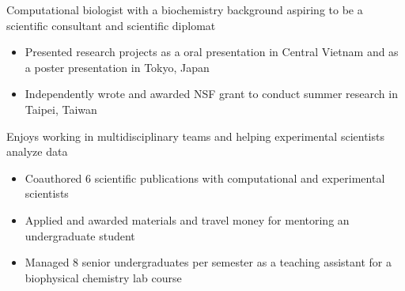 

\begin{cventries}
\vspace{-4.0mm}

  \cventry
    {} %
    {} %
    {} %
    {} %
    {
      \begin{cvitems} %
        \item {Computational biologist with a biochemistry background aspiring to be a scientific consultant and scientific diplomat}
        \begin{itemize}
       	 	\item Presented research projects as a oral presentation in Central Vietnam and as a poster presentation in Tokyo, Japan
       	 	\item Independently wrote and awarded NSF grant to conduct summer research in Taipei, Taiwan
        \end{itemize}
        \vspace{1.0mm}
        \item {Enjoys working in multidisciplinary teams and helping experimental scientists analyze data}
        \begin{itemize}
         	\item Coauthored 6 scientific publications with computational and experimental scientists
         	\item Applied and awarded materials and travel money for mentoring an undergraduate student
         	\item Managed 8 senior undergraduates per semester as a teaching assistant for a biophysical chemistry lab course
        \end{itemize}
      \end{cvitems}
    }
\vspace{-4.0mm}
\end{cventries}
